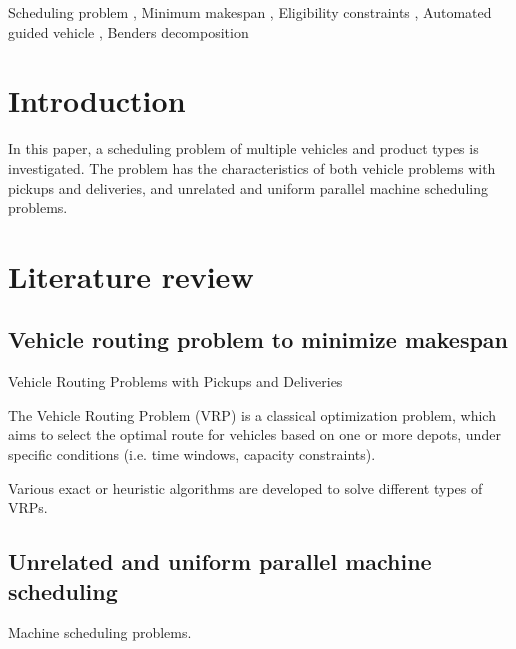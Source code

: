 \documentclass[preprint,12pt,authoryear]{elsarticle}
\begin{document}
\begin{frontmatter}
\begin{keyword}
    Scheduling problem \sep
    Minimum makespan \sep
    Eligibility constraints \sep
    Automated guided vehicle \sep
    Benders decomposition



\end{keyword}

\end{frontmatter}


\section{Introduction}

In this paper, a scheduling problem of multiple vehicles and product types is investigated. 
The problem has the  characteristics of both vehicle problems with pickups and deliveries,
and unrelated and uniform parallel machine scheduling problems.


\section{Literature review}

\subsection{Vehicle routing problem to minimize makespan}

Vehicle Routing Problems with Pickups and Deliveries

The Vehicle Routing Problem (VRP) is a classical optimization problem, 
which aims to select the optimal route for vehicles based on one or more depots,
under specific conditions (i.e. time windows, capacity constraints).

Various exact or heuristic algorithms are developed to solve different types of VRPs.

\subsection{Unrelated and uniform parallel machine scheduling}

Machine scheduling problems.
\end{document}

